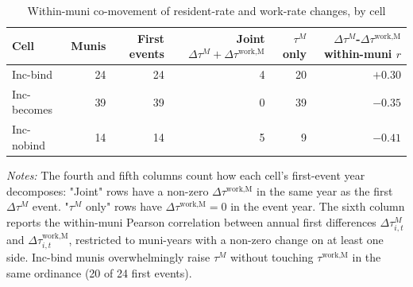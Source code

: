 \begin{table}[!htbp]
  \centering
  \caption{Within-muni co-movement of resident-rate and work-rate changes, by cell}
  \label{tab:joint_event_diagnostic}
  \footnotesize
  \renewcommand{\arraystretch}{1.0}
  \begin{tabular}{lrrrrr}
    \toprule
    Cell & Munis & First events & Joint $\Delta\tau^M{+}\Delta\tau^{\text{work,M}}$ & $\tau^M$ only & $\Delta\tau^M$-$\Delta\tau^{\text{work,M}}$ within-muni $r$ \\
    \midrule
    Inc-bind     & 24 & 24 & 4  & 20 & $+0.30$ \\
    Inc-becomes  & 39 & 39 & 0  & 39 & $-0.35$ \\
    Inc-nobind   & 14 & 14 & 5  & 9  & $-0.41$ \\
    \bottomrule
  \end{tabular}
  \vspace{0.3em}
  \begin{minipage}{0.95\textwidth}
    \footnotesize \textit{Notes:} The fourth and fifth columns count how each cell's first-event year decomposes: "Joint" rows have a non-zero $\Delta\tau^{\text{work,M}}$ in the same year as the first $\Delta\tau^M$ event. "$\tau^M$ only" rows have $\Delta\tau^{\text{work,M}} = 0$ in the event year. The sixth column reports the within-muni Pearson correlation between annual first differences $\Delta\tau^M_{i,t}$ and $\Delta\tau^{\text{work,M}}_{i,t}$, restricted to muni-years with a non-zero change on at least one side. Inc-bind munis overwhelmingly raise $\tau^M$ without touching $\tau^{\text{work,M}}$ in the same ordinance (20 of 24 first events).
  \end{minipage}
\end{table}
